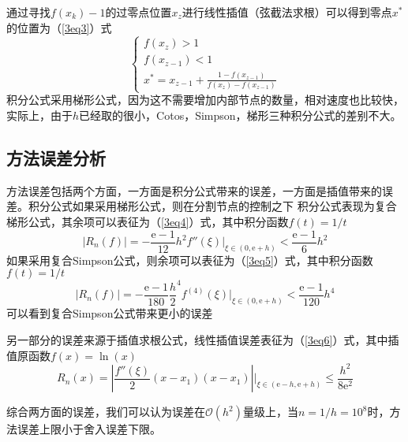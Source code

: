 \documentclass[onecolumn,compsoc]{IEEEtran}
\renewcommand{\|}{\Bigg |}
\newcommand{\e}{\mathrm{e}}
\begin{document}
通过寻找$f(x_k)-1$的过零点位置$x_z$进行线性插值（弦截法求根）可以得到零点$x^*$的位置为（\ref{3eq3}）式
\begin{equation}\label{3eq3}\begin{cases}
f(x_z) > 1\\
f(x_{z-1}) < 1\\
x^* = x_{z-1} + \frac{1-f(x_{z-1})}{f(x_z)-f(x_{z-1})}
\end{cases}\end{equation}
积分公式采用梯形公式，因为这不需要增加内部节点的数量，相对速度也比较快，实际上，由于$h$已经取的很小，Cotos，Simpson，梯形三种积分公式的差别不大。
\subsection{方法误差分析}
方法误差包括两个方面，一方面是积分公式带来的误差，一方面是插值带来的误差。积分公式如果采用梯形公式，则在分割节点的控制之下
积分公式表现为复合梯形公式，其余项可以表征为（\ref{3eq4}）式，其中积分函数$f(t) = 1 / t$
\begin{equation}\label{3eq4}
|R_n(f)| = -\frac{\e-1}{12}h^2f''(\xi)\|_{\xi\in(0,\e+h)} < \frac{\e-1}{6}h^2
\end{equation}
如果采用复合Simpson公式，则余项可以表征为（\ref{3eq5}）式，其中积分函数$f(t) = 1 / t$
\begin{equation}\label{3eq5}
|R_n(f)| = -\frac{\e-1}{180}\frac{h}{2}^4f^{(4)}(\xi)\|_{\xi\in(0,\e+h)} < \frac{\e-1}{120}h^4
\end{equation}
可以看到复合Simpson公式带来更小的误差

另一部分的误差来源于插值求根公式，线性插值误差表征为（\ref{3eq6}）式，其中插值原函数$f(x) = \ln(x)$
\begin{equation}\label{3eq6}
R_n(x) = |\frac{f''(\xi)}{2}(x-x_1)(x-x_1)|\|_{\xi \in (\e-h,\e+h)} \le \frac{h^2}{8\e^2}
\end{equation}

综合两方面的误差，我们可以认为误差在$\mathcal O (h^2)$量级上，当$n = 1/h = 10^8$时，方法误差上限小于舍入误差下限。
\end{document}
